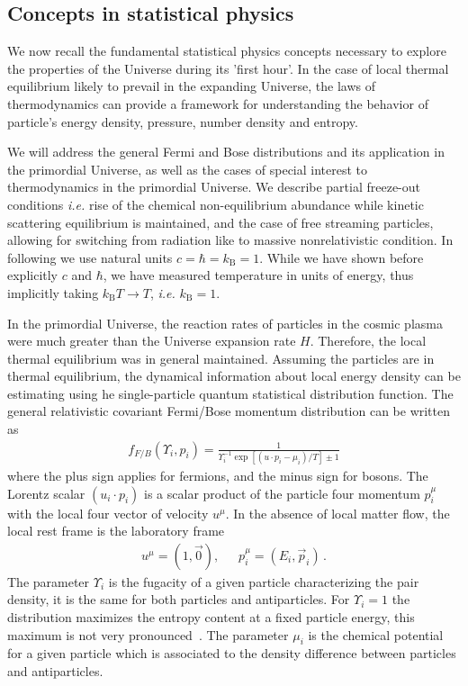 \subsection{Concepts in statistical physics} \label{sec:statphys}
We now recall the fundamental statistical physics concepts necessary to explore the properties of the Universe during its 'first hour'. In the case of local thermal equilibrium likely to prevail in the expanding Universe, the laws of thermodynamics can provide a framework for understanding the behavior of particle's energy density, pressure, number density and entropy.

We will address the general Fermi and Bose distributions and its application in the primordial Universe, as well as the cases of special interest to thermodynamics in the primordial Universe. We describe partial freeze-out conditions {\it i.e.\/} rise of the chemical non-equilibrium abundance while kinetic scattering equilibrium is maintained, and the case of free streaming particles, allowing for switching from radiation like to massive nonrelativistic condition. In following we use natural units $c=\hbar=k_\mathrm{B}=1$. While we have shown before explicitly $c$ and $\hbar$, we have measured temperature in units of energy, thus implicitly taking $k_\mathrm{B}T\to T$, {\it i.e.\/} $k_\mathrm{B}=1$.

In the primordial Universe, the reaction rates of particles in the cosmic plasma were much greater than the Universe expansion rate $H$. Therefore, the local thermal equilibrium was in general maintained. Assuming the particles are in thermal equilibrium, the dynamical information about local energy density can be estimating using he single-particle quantum statistical distribution function. The general relativistic covariant Fermi/Bose momentum distribution can be written as
\begin{align}
f_{F/B}(\Upsilon_i,p_i)=\frac{1}{\Upsilon^{-1}_i\exp{\left[(u\cdot p_i-\mu_i)/T\right]}\pm1}
\end{align}
where the plus sign applies for fermions, and the minus sign for bosons. The Lorentz scalar $(u_i\cdot p_i)$ is a scalar product of the particle four momentum $p^\mu_i$ with the local four vector of velocity $u^\mu$. In the absence of local matter flow, the local rest frame is the laboratory frame 
\begin{align}
u^\mu=\left(1,\vec{0}\right),\,\,\,\,\,\,\,\,\, p^\mu_i=\left(E_i,\vec{p}_i\right)\,.
\end{align} 
The parameter $\Upsilon_i$ is the fugacity of a given particle characterizing the pair density, it is the same for both particles and antiparticles. For $\Upsilon_i=1$ the distribution maximizes the entropy content at a fixed particle energy, this maximum is not very pronounced~\cite{Letessier:1993qa}. The parameter $\mu_i$ is the chemical potential for a given particle which is associated to the density difference between particles and antiparticles.

